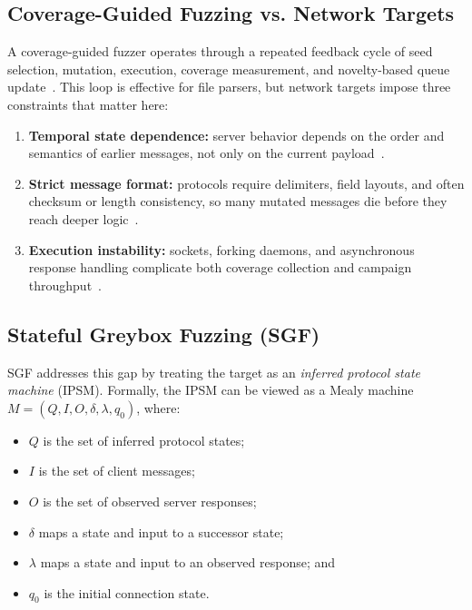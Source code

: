 \documentclass[final,5p,times,number]{elsarticle}
\begin{document}
\subsection{Coverage-Guided Fuzzing vs. Network Targets}
A coverage-guided fuzzer operates through a repeated feedback cycle of seed selection, mutation, execution, coverage measurement, and novelty-based queue update~\cite{seed_selection_successful_fuzzing_2021,one_fuzzing_strategy_rule_2022,regression_greybox_fuzzing_2021,efficient_errors_2022}.
This loop is effective for file parsers, but network targets impose three constraints that matter here:
\begin{enumerate}
    \item \textbf{Temporal state dependence:} server behavior depends on the order and semantics of earlier messages, not only on the current payload~\cite{aflnet,stateafl,sgf_usenix22,formatted_stateful_greybox_fuzzing_2024}.
    \item \textbf{Strict message format:} protocols require delimiters, field layouts, and often checksum or length consistency, so many mutated messages die before they reach deeper logic~\cite{gramatron_effective_grammar_aware_2021,griffin_grammar_free_dbms_2022,formatted_stateful_greybox_fuzzing_2024}.
    \item \textbf{Execution instability:} sockets, forking daemons, and asynchronous response handling complicate both coverage collection and campaign throughput~\cite{snapfuzz_high_throughput_fuzzing_2022}.
\end{enumerate}

\subsection{Stateful Greybox Fuzzing (SGF)}
SGF addresses this gap by treating the target as an \emph{inferred protocol state machine} (IPSM). Formally, the IPSM can be viewed as a Mealy machine $M = (Q, I, O, \delta, \lambda, q_0)$, where:
\begin{itemize}
    \item $Q$ is the set of inferred protocol states;
    \item $I$ is the set of client messages;
    \item $O$ is the set of observed server responses;
    \item $\delta$ maps a state and input to a successor state;
    \item $\lambda$ maps a state and input to an observed response; and
    \item $q_0$ is the initial connection state.
\end{itemize}
\end{document}

